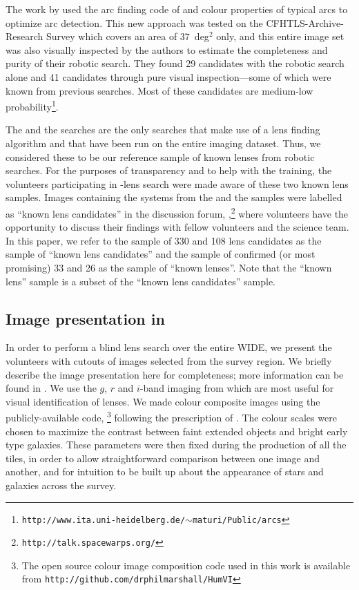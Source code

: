 \documentclass[useAMS,usenatbib,a4paper]{mn2e}
\begin{document}
The work by \citet{Maturi2014} used the arc finding code of
\citet{Seidel2007} and colour properties of typical arcs to optimize arc
detection. This new approach was tested on the CFHTLS-Archive-Research
Survey \citep[CARS,][]{Erben2009} which covers an area of 37~deg$^2$
only, and this entire image set was also visually inspected by the authors to
estimate the completeness and purity of their robotic search. They found 29
candidates with the robotic search alone and 41 candidates through pure
visual inspection---some of which were known from previous searches. Most
of these candidates are medium-low
probability\footnote{\texttt{http://www.ita.uni-heidelberg.de/$\sim$maturi/Public/arcs}}.

The \rf and the \af searches are the only searches that make use of a
lens finding algorithm and that have been run on the entire \cfhtls
imaging dataset.  Thus, we considered these to be our reference sample of known
lenses from robotic searches. For the purposes of transparency and to
help with the training, the volunteers participating in \sw-\cfhtls lens
search were made aware of these two known lens samples. Images
containing the systems from the \rf and the \af samples were labelled as
``known lens candidates'' in the \sw discussion forum,
\Talk,\footnote{\texttt{http://talk.spacewarps.org/}} where volunteers have the
opportunity to discuss their findings with fellow volunteers and the
science team. In this paper, we refer to the sample of 330 \rf and 108
\af lens candidates as the sample of ``known lens candidates'' and the
sample of confirmed (or most promising) 33 \rf and 26 \af as the sample
of ``known lenses''. Note that the ``known lens'' sample is a subset of
the ``known lens candidates'' sample.


\subsection{Image presentation in \sw}
\label{sec:data:impres}

In order to perform a blind lens search over the entire \cfhtls
WIDE, we present the volunteers with cutouts of images selected
from the survey region. We briefly describe the image presentation here
for completeness; more information can be found in \PaperOne. We use
the $g$, $r$ and $i$-band imaging from \cfhtls which are most useful for
visual identification of lenses.  We made colour composite images using
the publicly-available code, \humvi\footnote{The open source  colour image
composition code used in this work is available from
\texttt{http://github.com/drphilmarshall/HumVI}} following the
prescription of \citet{Lupton2004}. The colour scales were chosen to
maximize the contrast between faint extended objects and bright early
type galaxies. These parameters
were then fixed during the production of all the tiles, in order to allow
straightforward comparison between one image and another, and for
intuition to be built up about the appearance of stars and galaxies
across the survey.
\end{document}
